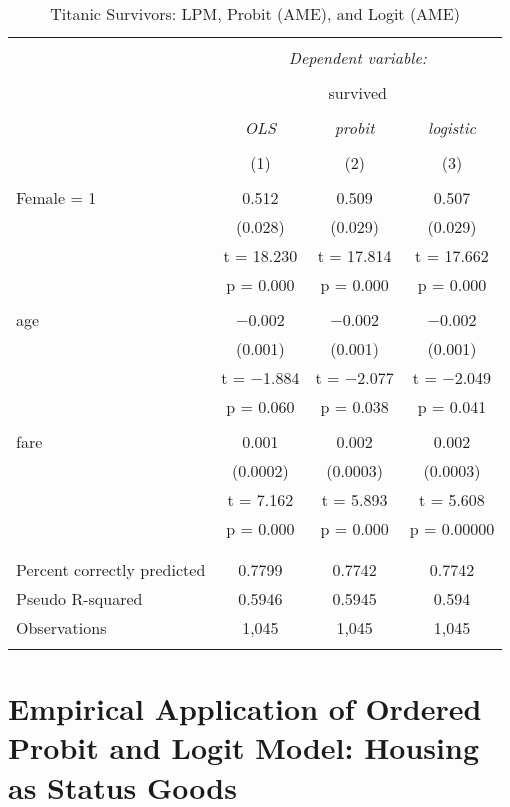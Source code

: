 \documentclass[
  12pt,
]{article}
\begin{document}
\begin{table}[t] \centering 
  \caption{Titanic Survivors: LPM, Probit (AME), and Logit (AME)} 
  \label{titanic} 
\begin{tabular}{@{\extracolsep{5pt}}lccc} 
\\[-1.8ex]\hline 
\hline \\[-1.8ex] 
 & \multicolumn{3}{c}{\textit{Dependent variable:}} \\ 
\cline{2-4} 
\\[-1.8ex] & \multicolumn{3}{c}{survived} \\ 
\\[-1.8ex] & \textit{OLS} & \textit{probit} & \textit{logistic} \\ 
\\[-1.8ex] & (1) & (2) & (3)\\ 
\hline \\[-1.8ex] 
 Female = 1 & 0.512 & 0.509 & 0.507 \\ 
  & (0.028) & (0.029) & (0.029) \\ 
  & t = 18.230 & t = 17.814 & t = 17.662 \\ 
  & p = 0.000 & p = 0.000 & p = 0.000 \\ 
  & & & \\ 
 age & $-$0.002 & $-$0.002 & $-$0.002 \\ 
  & (0.001) & (0.001) & (0.001) \\ 
  & t = $-$1.884 & t = $-$2.077 & t = $-$2.049 \\ 
  & p = 0.060 & p = 0.038 & p = 0.041 \\ 
  & & & \\ 
 fare & 0.001 & 0.002 & 0.002 \\ 
  & (0.0002) & (0.0003) & (0.0003) \\ 
  & t = 7.162 & t = 5.893 & t = 5.608 \\ 
  & p = 0.000 & p = 0.000 & p = 0.00000 \\ 
  & & & \\ 
\hline \\[-1.8ex] 
Percent correctly predicted & 0.7799 & 0.7742 & 0.7742 \\ 
Pseudo R-squared & 0.5946 & 0.5945 & 0.594 \\ 
Observations & 1,045 & 1,045 & 1,045 \\ 
\hline 
\hline \\[-1.8ex] 
\end{tabular} 
\end{table}

\hypertarget{empirical-application-of-ordered-probit-and-logit-model-housing-as-status-goods}{%
\section{Empirical Application of Ordered Probit and Logit Model:
Housing as Status
Goods}\label{empirical-application-of-ordered-probit-and-logit-model-housing-as-status-goods}}
\end{document}
